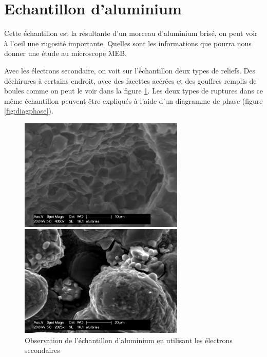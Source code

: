 \documentclass[a4paper,12pt]{article}
\begin{document}
\section{Echantillon d'aluminium}
Cette échantillon est la résultante d'un morceau d'aluminium brisé, on peut voir à l'oeil une rugosité importante. Quelles sont les informations que pourra nous donner une étude au microscope MEB.

Avec les électrons secondaire, on voit sur l'échantillon deux types de reliefs. Des déchirures à certains endroit, avec des facettes acérées et des gouffres remplis de boules comme on peut le voir dans la figure \ref{fig:alu_reliefs}. Les deux types de ruptures dans ce même échantillon peuvent être expliqués à l'aide d'un diagramme de phase (figure \ref{fig:diagphase}).
\begin{figure}
\begin{minipage}[c]{.55\linewidth}
\centering
\includegraphics[width=0.7\textwidth]{images/alu_arretes.png}
 \end{minipage}\hfill
\begin{minipage}[c]{.55\linewidth}
\centering
\includegraphics[width=0.7\textwidth]{images/alu_brise.png}
\end{minipage}
\caption{Observation de l'échantillon d'aluminium en utilisant les électrons secondaires}
\label{fig:alu_reliefs}
\end{figure}
\end{document}
